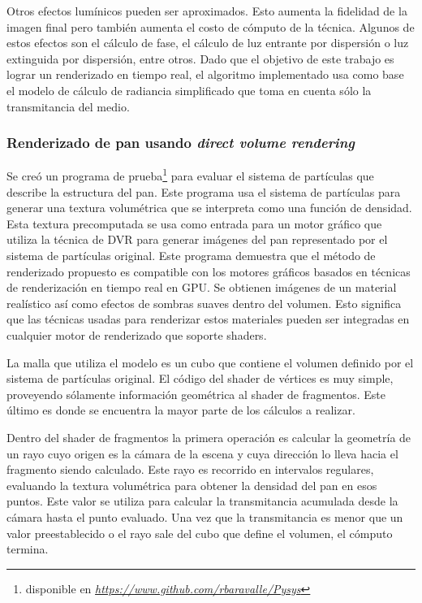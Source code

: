 \documentclass[oneside,a4paper,spanish,links]{amca}
\begin{document}
Otros efectos lumínicos pueden ser aproximados. Esto aumenta la
fidelidad de la imagen final pero también aumenta el costo de cómputo
de la técnica. Algunos de estos efectos son el cálculo de fase, el c\'alculo de
luz entrante por dispersión o luz extinguida por dispersión, entre
otros. Dado que el objetivo de este trabajo es lograr un renderizado
en tiempo real, el algoritmo implementado usa como base el modelo de
cálculo de radiancia simplificado que toma en cuenta sólo la
transmitancia del medio.

\subsubsection{Renderizado de pan usando \emph{direct volume rendering}}

Se cre\'o un programa de prueba\footnote{disponible en
  \emph{\url{https://www.github.com/rbaravalle/Pysys}}} para evaluar
el sistema de partículas que describe la estructura del pan. Este
programa usa el sistema de partículas para generar una textura
volumétrica que se interpreta como una función de densidad. Esta
textura precomputada se usa como entrada para un motor gráfico que utiliza la
técnica de DVR para generar imágenes del pan representado por el
sistema de partículas original. Este programa demuestra que el método
de renderizado propuesto es compatible con los motores gráficos
basados en técnicas de renderización en tiempo real en GPU. Se
obtienen imágenes de un material realístico así como efectos de
sombras suaves dentro del volumen. Esto significa que las técnicas
usadas para renderizar estos materiales pueden ser integradas en
cualquier motor de renderizado que soporte shaders.

La malla que utiliza el modelo es un cubo que contiene el volumen
definido por el sistema de partículas original. El código del shader
de vértices es muy simple, proveyendo sólamente información geométrica
al shader de fragmentos. Este último es donde se encuentra la mayor
parte de los cálculos a realizar.

Dentro del shader de fragmentos la primera operaci\'on es calcular la
geometría de un rayo cuyo origen es la cámara de la escena y cuya
dirección lo lleva hacia el fragmento siendo calculado. Este rayo es
recorrido en intervalos regulares, evaluando la textura volumétrica
para obtener la densidad del pan en esos puntos. Este valor se utiliza
para calcular la transmitancia acumulada desde la cámara hasta el
punto evaluado. Una vez que la transmitancia es menor que un valor
preestablecido o el rayo sale del cubo que define el volumen, el
cómputo termina.
\end{document}

